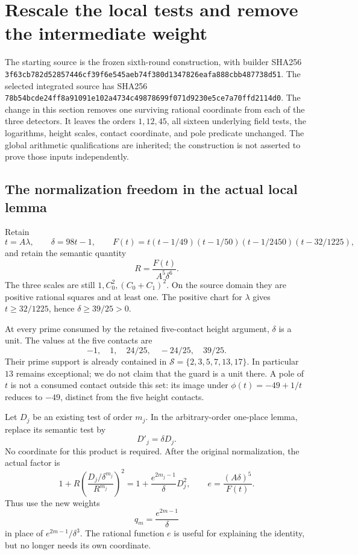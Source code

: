 \section{Rescale the local tests and remove the intermediate weight}

The starting source is the frozen sixth-round construction, with builder
SHA256
\texttt{3f63cb782d52857446cf39f6e545aeb74f380d1347826eafa888cbb487738d51}.
The selected integrated source has SHA256
\texttt{78b54bcde24ff8a91091e102a4734c49878699f071d9230e5ce7a70ffd2114d0}.
The change in this section removes one surviving rational coordinate
from each of the three detectors. It leaves the orders $1,12,45$, all
sixteen underlying field tests, the logarithms, height scales, contact
coordinate, and pole predicate unchanged. The global arithmetic
qualifications are inherited; the construction is not asserted to prove
those inputs independently.

\subsection{The normalization freedom in the actual local lemma}

Retain
\[
 t=A\lambda,\qquad\delta=98t-1,\qquad
 F(t)=t(t-1/49)(t-1/50)(t-1/2450)(t-32/1225),
\]
and retain the semantic quantity
\[
 R=\frac{F(t)}{A^5\delta^6}.
\]
The three scales are still $1,C_0^2,(C_0+C_1)^2$. On the source domain
they are positive rational squares and at least one. The positive chart
for $\lambda$ gives $t\ge32/1225$, hence $\delta\ge39/25>0$.

At every prime consumed by the retained five-contact height argument,
$\delta$ is a unit. The values at the five contacts are
\[
 -1,\quad1,\quad24/25,\quad-24/25,\quad39/25.
\]
Their prime support is already contained in
$\mathcal S=\{2,3,5,7,13,17\}$. In particular $13$ remains exceptional;
we do not claim that the guard is a unit there. A pole of $t$ is not a
consumed contact outside this set: its image under
$\phi(t)=-49+1/t$ reduces to $-49$, distinct from the five height contacts.

Let $D_j$ be an existing test of order $m_j$. In the arbitrary-order
one-place lemma, replace its semantic test by
\[
 D'_j=\delta D_j.
\]
No coordinate for this product is required. After the original
normalization, the actual factor is
\[
 1+R\left(\frac{D_j/\delta^{m_j}}{R^{m_j}}\right)^2
   =1+\frac{e^{2m_j-1}}{\delta}D_j^2,
 \qquad e=\frac{(A\delta)^5}{F(t)}.
\]
Thus use the new weights
\[
 q_m=\frac{e^{2m-1}}{\delta}
\]
in place of $e^{2m-1}/\delta^3$. The rational function $e$ is useful
for explaining the identity, but no longer needs its own coordinate.

